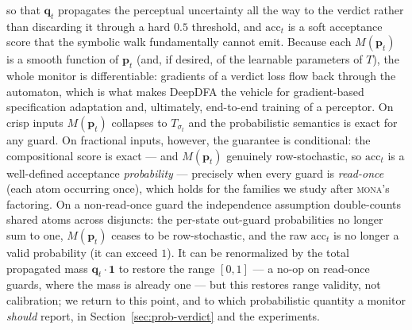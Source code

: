 so that $\mathbf{q}_t$ propagates the perceptual uncertainty all the way to the verdict rather than discarding it through a hard $0.5$ threshold, and $\mathrm{acc}_t$ is a soft acceptance score that the symbolic walk fundamentally cannot emit. Because each $M(\mathbf{p}_t)$ is a smooth function of $\mathbf{p}_t$ (and, if desired, of the learnable parameters of $T$), the whole monitor is differentiable: gradients of a verdict loss flow back through the automaton, which is what makes DeepDFA the vehicle for gradient-based specification adaptation and, ultimately, end-to-end training of a perceptor. On crisp inputs $M(\mathbf{p}_t)$ collapses to $T_{\sigma_t}$ and the probabilistic semantics is exact for any guard. On fractional inputs, however, the guarantee is conditional: the compositional score is exact --- and $M(\mathbf{p}_t)$ genuinely row-stochastic, so $\mathrm{acc}_t$ is a well-defined acceptance \emph{probability} --- precisely when every guard is \emph{read-once} (each atom occurring once), which holds for the \ltlf families we study after \textsc{mona}'s factoring. On a non-read-once guard the independence assumption double-counts shared atoms across disjuncts: the per-state out-guard probabilities no longer sum to one, $M(\mathbf{p}_t)$ ceases to be row-stochastic, and the raw $\mathrm{acc}_t$ is no longer a valid probability (it can exceed $1$). It can be renormalized by the total propagated mass $\mathbf{q}_t \cdot \mathbf{1}$ to restore the range $[0,1]$ --- a no-op on read-once guards, where the mass is already one --- but this restores range validity, not calibration; we return to this point, and to which probabilistic quantity a monitor \emph{should} report, in Section~\ref{sec:prob-verdict} and the experiments.


